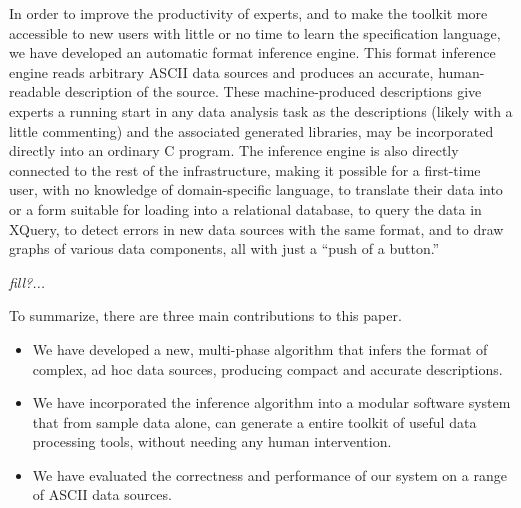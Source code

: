 In order to improve the productivity of experts, and to 
make the \pads{} toolkit more accessible to new users with 
little or no time to learn the specification language,
we have developed an automatic format inference engine.
This format inference engine reads arbitrary ASCII data sources
and produces an accurate, human-readable \pads{} description of the source.
These machine-produced descriptions give experts a running start
in any data analysis task as the descriptions (likely with a little
commenting) and the associated generated libraries, may be 
incorporated directly into an ordinary C program.
The inference engine is also directly connected to the rest of the
\pads{} infrastructure, making it possible for a first-time user,
with no knowledge of \pads{} domain-specific language, to 
translate their data into \xml{} or a form suitable for loading
into a relational database, to query the data in XQuery,
to detect errors in new data sources with the same format,
and to draw graphs of various data components, all
with just a ``push of a button.''

{\em fill?...}

To summarize, there are three main contributions to this paper.

\begin{itemize}
\item We have developed a new, multi-phase algorithm 
that infers the format of complex, ad hoc data sources,
producing compact and accurate \pads{} descriptions.

\item We have incorporated the inference algorithm into 
a modular software system that from sample data alone, can
generate a entire toolkit of useful data processing tools,
without needing any human intervention.
 
\item We have evaluated the correctness and performance of
our system on a range of ASCII data sources.
\end{itemize}





